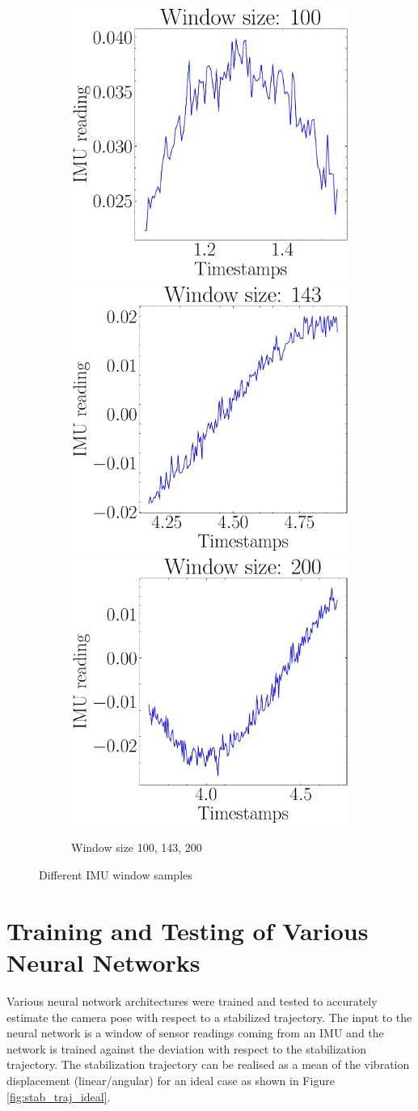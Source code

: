 \begin{figure}[H]
    \begin{subfigure}{\linewidth}
    \includegraphics[width=.3\linewidth]{images/fig_chapter4/imu_windows/imu_window_size_100.pdf}\hfill
    \includegraphics[width=.3\linewidth]{images/fig_chapter4/imu_windows/imu_window_size_143.pdf}\hfill
    \includegraphics[width=.3\linewidth]{images/fig_chapter4/imu_windows/imu_window_size_200.pdf}\hfill
    \caption{Window size 100, 143, 200}
    \end{subfigure}
\caption{Different IMU window samples}
\label{fig:imu_window_samples}
\end{figure}

\section{Training and Testing of Various Neural Networks}
Various neural network architectures were trained and tested to accurately estimate the camera pose with respect to a stabilized trajectory. The input to the neural network is a window of sensor readings coming from an IMU and the network is trained against the deviation with respect to the stabilization trajectory. The stabilization trajectory can be realised as a mean of the vibration displacement (linear/angular) for an ideal case as shown in Figure \ref{fig:stab_traj_ideal}. 

